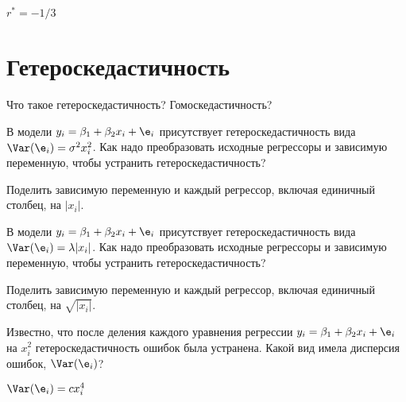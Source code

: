 \documentclass[pdftex,11pt,openany]{book}\usepackage[]{graphicx}\usepackage[]{color}
\begin{document}
\begin{solution}
$r^* = -1/3$
\end{solution}








\chapter{Гетероскедастичность}


\begin{problem}
Что такое гетероскедастичность? Гомоскедастичность?
\end{problem}
\begin{solution}
\end{solution}

\begin{problem}
В модели $y_i = \beta_1 + \beta_2 x_i + \e_i$ присутствует гетероскедастичность вида $\Var(\e_i)=\sigma^2 x^2_i$. Как надо преобразовать исходные регрессоры и зависимую переменную, чтобы устранить гетероскедастичность?
\end{problem}

\begin{solution}
Поделить зависимую переменную и каждый регрессор, включая единичный столбец, на $|x_i|$.
\end{solution}


\begin{problem}
В модели $y_i = \beta_1 + \beta_2 x_i + \e_i$ присутствует гетероскедастичность вида $\Var(\e_i)=\lambda |x_i|$. Как надо преобразовать исходные регрессоры и зависимую переменную, чтобы устранить гетероскедастичность?
\end{problem}

\begin{solution}
Поделить зависимую переменную и каждый регрессор, включая единичный столбец, на $\sqrt{|x_i|}$.
\end{solution}


\begin{problem}
Известно, что после деления каждого уравнения регрессии $y_i = \beta_1 + \beta_2 x_i + \e_i$ на $x_i^2$ гетероскедастичность ошибок была устранена. Какой вид имела дисперсия ошибок, $\Var(\e_i)$?
\end{problem}

\begin{solution}
$\Var(\e_i)=cx_i^4$
\end{solution}
\end{document}
